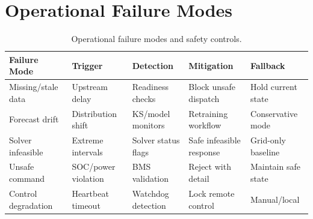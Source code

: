 \documentclass[11pt,a4paper,twocolumn]{article}
\begin{document}
\section{Operational Failure Modes}\label{app:failure_modes}

\begin{table}[htbp]
\centering\small
\caption{Operational failure modes and safety controls.}
\label{tab:failure_modes}
\begin{tabular}{p{2.5cm}p{2.2cm}p{2.5cm}p{2.5cm}p{2.3cm}}
\toprule
Failure Mode & Trigger & Detection & Mitigation & Fallback \\
\midrule
Missing/stale data & Upstream delay & Readiness checks & Block unsafe dispatch & Hold current state \\
Forecast drift & Distribution shift & KS/model monitors & Retraining workflow & Conservative mode \\
Solver infeasible & Extreme intervals & Solver status flags & Safe infeasible response & Grid-only baseline \\
Unsafe command & SOC/power violation & BMS validation & Reject with detail & Maintain safe state \\
Control degradation & Heartbeat timeout & Watchdog detection & Lock remote control & Manual/local \\
\bottomrule
\end{tabular}
\end{table}
\end{document}
